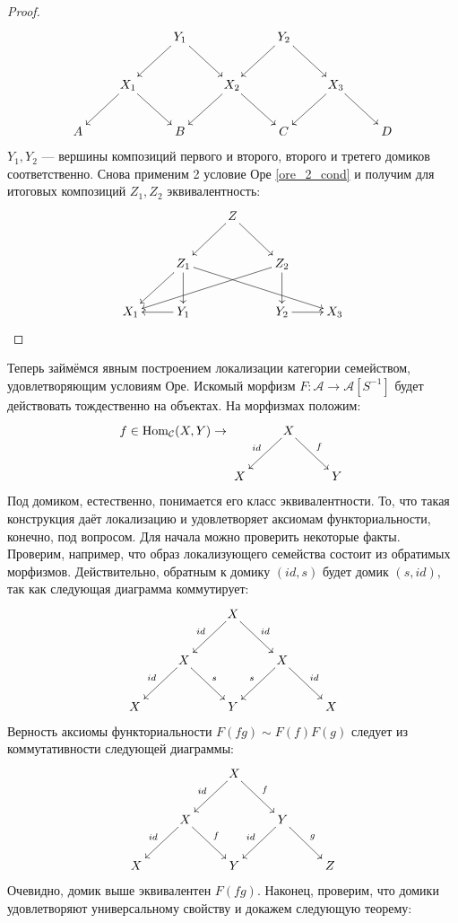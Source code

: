 \documentclass[../main.tex]{subfiles}
\begin{document}
\begin{proof}
  \begin{equation*}
    \xymatrix{&&Y_1\ar[ld]\ar[rd]&&Y_2\ar[ld]\ar[rd]\\
      &X_1\ar[rd]\ar[ld]&&X_2\ar[rd]\ar[ld]&&X_3\ar[ld]\ar[rd]\\
    A&&B&&C&&D}
  \end{equation*}
  $Y_1, Y_2$ --- вершины композиций первого и второго, второго и третего домиков соответственно. Снова применим 2 условие Оре \eqref{ore_2_cond} и получим для итоговых композиций $Z_1, Z_2$ эквивалентность:
  \begin{equation*}
    \xymatrix{&&Z\ar[rd]\ar[ld]\\
      &Z_1\ar[dl]\ar[d]\ar[rrrd]&&Z_2\ar[d]\ar[llld]\\
    X_1&Y_1\ar[l]&&Y_2\ar[r]&X_3}
  \end{equation*}
    \end{proof}
Теперь займёмся явным построением локализации категории семейством, удовлетворяющим условиям Оре.  Искомый морфизм $F:\mathcal{A} \to \mathcal{A}[S^{-1}]$ будет действовать тождественно на объектах.  На морфизмах положим:
       \begin{equation}\label{ore_functor}
	 f\in \text{Hom}_\mathcal{C}(X,Y) \to \xymatrix{&X\ar[ld]_{id}\ar[rd]^{f}\\X&&Y}
      \end{equation}
Под домиком, естественно, понимается его класс эквивалентности.  То, что такая конструкция даёт локализацию и удовлетворяет аксиомам функториальности, конечно, под вопросом.  Для начала можно проверить некоторые факты. Проверим, например, что образ локализующего семейства состоит из обратимых морфизмов. Действительно, обратным к домику $(id, s)$ будет домик $(s, id)$, так как следующая диаграмма коммутирует:
\begin{equation*}
	\xymatrix{&&X\ar[rd]^{id}\ar[ld]_{id}\\
	  &X\ar[rd]^s\ar[ld]_{id}&&X\ar[rd]^{id}\ar[ld]_s\\
	X&&Y&&X}
	\end{equation*}
Верность аксиомы функториальности $F(fg) \sim F(f)F(g)$ следует из коммутативности следующей диаграммы:
      \begin{equation*}
	\xymatrix{&&X\ar[ld]_{id}\ar[rd]^f\\
	  &X\ar[ld]_{id}\ar[rd]^f&&Y\ar[rd]^g\ar[ld]_{id}\\
	X&&Y&&Z}
\end{equation*}
Очевидно, домик выше эквивалентен $F(fg)$. Наконец, проверим, что домики удовлетворяют универсальному свойству и докажем следующую теорему:
\end{document}
